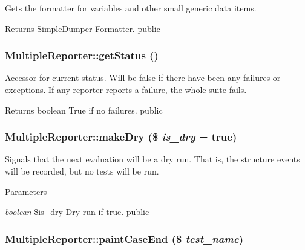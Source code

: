 \label{class_multiple_reporter_ae0a4ebf1c103d8b65b32245a828f7256}
Gets the formatter for variables and other small generic data items. \begin{DoxyReturn}{Returns}
\hyperlink{class_simple_dumper}{SimpleDumper} Formatter.  public 
\end{DoxyReturn}
\hypertarget{class_multiple_reporter_ad690d4e9c2b2183feb0e93a6b4cac406}{
\subsubsection[{getStatus}]{\setlength{\rightskip}{0pt plus 5cm}MultipleReporter::getStatus ()}}
\label{class_multiple_reporter_ad690d4e9c2b2183feb0e93a6b4cac406}
Accessor for current status. Will be false if there have been any failures or exceptions. If any reporter reports a failure, the whole suite fails. \begin{DoxyReturn}{Returns}
boolean True if no failures.  public 
\end{DoxyReturn}
\hypertarget{class_multiple_reporter_a66eeb60bbe27eaceb0447a9c20337414}{
\subsubsection[{makeDry}]{\setlength{\rightskip}{0pt plus 5cm}MultipleReporter::makeDry (\$ {\em is\_\-dry} = {\ttfamily true})}}
\label{class_multiple_reporter_a66eeb60bbe27eaceb0447a9c20337414}
Signals that the next evaluation will be a dry run. That is, the structure events will be recorded, but no tests will be run. 
\begin{DoxyParams}{Parameters}
\item[{\em boolean}]\$is\_\-dry Dry run if true.  public \end{DoxyParams}
\hypertarget{class_multiple_reporter_a8affb95d16ee73a0fd2f9ff7a0b16b32}{
\subsubsection[{paintCaseEnd}]{\setlength{\rightskip}{0pt plus 5cm}MultipleReporter::paintCaseEnd (\$ {\em test\_\-name})}}
\label{class_multiple_reporter_a8affb95d16ee73a0fd2f9ff7a0b16b32}
